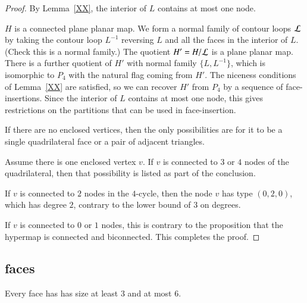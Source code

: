 \begin{proof}
By Lemma~\ref{XX}, the interior of $L$ contains at most one node.

$H$ is a connected plane planar map.  We form a normal family of
contour loops ${\cal L}$ by taking the contour loop $L^{-1}$
reversing $L$ and all the faces in the interior of $L$.
(Check this is a normal family.)  The quotient $H' = H/{\cal L}$ is
a plane planar map.  There is a further quotient of $H'$ with normal
family $\{L,L^{-1}\}$, which is isomorphic to $P_4$ with the natural
flag coming from $H'$.  The niceness conditions of Lemma~\ref{XX} are
satisfied, so we can recover $H'$ from $P_4$ by a sequence of
face-insertions.  Since the interior of $L$ contains at most one
node, this gives restrictions on the partitions that can be used in
face-insertion.

If there are no enclosed vertices, then the only possibilities are
for it to be a single quadrilateral face or a pair of adjacent
triangles.

Assume there is one enclosed vertex $v$.  If $v$ is connected to $3$
or $4$ nodes of the quadrilateral, then that possibility is listed
as part of the conclusion.

If $v$ is connected to $2$ nodes in the $4$-cycle, then the
node $v$ has type $(0,2,0)$, which has degree $2$, contrary to the lower bound of $3$ on degrees.

If $v$ is connected to $0$ or $1$ nodes, this is contrary to the proposition that the hypermap is connected and biconnected.  This completes the proof.
\end{proof}


\subsection{faces}

\begin{lemma}  Every face has has size at least $3$ and at most $6$.
\end{lemma}

